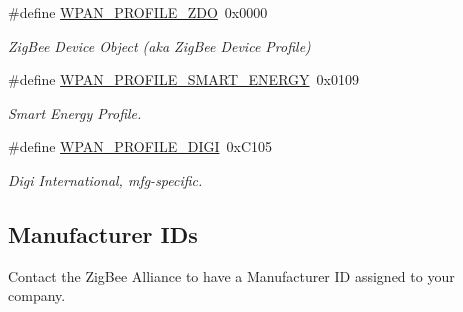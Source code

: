 \begin{DoxyCompactItemize}
\item 
\mbox{\label{group__wpan__aps_gabdbce33bdd976b65877a241842b73a20}} 
\#define \hyperlink{group__wpan__aps_gabdbce33bdd976b65877a241842b73a20}{W\+P\+A\+N\+\_\+\+P\+R\+O\+F\+I\+L\+E\+\_\+\+Z\+DO}~0x0000
\begin{DoxyCompactList}\small\item\em Zig\+Bee Device Object (aka Zig\+Bee Device Profile) \end{DoxyCompactList}\item 
\mbox{\label{group__wpan__aps_ga7cc56763cce2df7785d8d5e75f9e1a40}} 
\#define \hyperlink{group__wpan__aps_ga7cc56763cce2df7785d8d5e75f9e1a40}{W\+P\+A\+N\+\_\+\+P\+R\+O\+F\+I\+L\+E\+\_\+\+S\+M\+A\+R\+T\+\_\+\+E\+N\+E\+R\+GY}~0x0109
\begin{DoxyCompactList}\small\item\em Smart Energy Profile. \end{DoxyCompactList}\item 
\mbox{\label{group__wpan__aps_gaa90d7d1301c7de503f39113eb83e93e5}} 
\#define \hyperlink{group__wpan__aps_gaa90d7d1301c7de503f39113eb83e93e5}{W\+P\+A\+N\+\_\+\+P\+R\+O\+F\+I\+L\+E\+\_\+\+D\+I\+GI}~0x\+C105
\begin{DoxyCompactList}\small\item\em Digi International, mfg-\/specific. \end{DoxyCompactList}\end{DoxyCompactItemize}
\subsection*{Manufacturer I\+Ds}
\label{_amgrp81f39d32ef7ae17245197138275a83b5}%
Contact the Zig\+Bee Alliance to have a Manufacturer ID assigned to your company.

